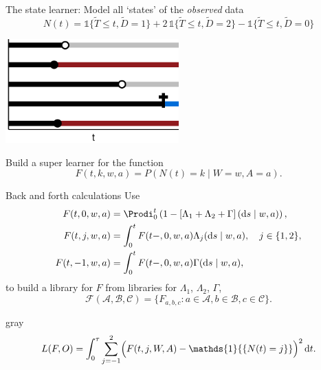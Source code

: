 \documentclass[smaller]{beamer}\usepackage{listings}
\newcommand*\diff{\mathop{}\!\mathrm{d}}
\newcommand{\midd}{\; \middle|\;}
\newcommand{\1}{\mathds{1}}
\begin{document}
\begin{frame}[label={sec:org2d13ae0}]{The state learner: Model all `states' of the \emph{observed} data}
\begin{equation*}
  N(t) = \1{
    \{
      \tilde{T} \leq t, \tilde D=1
    \}} + 2\,\1{\{\tilde{T} \leq t, \tilde
    D=2\}} - \1{\{\tilde{T} \leq t, \tilde D=0\}}
\end{equation*}

\vfil

\begin{center}
\includegraphics[width=0.5\textwidth]{./multi-state-data-3-up.pdf}
\end{center}

\vfil

Build a super learner for the function
\begin{equation*}
    F(t, k, w,a) = P(N(t) = k \mid W=w, A=a).
\end{equation*}
\end{frame}

\begin{frame}[label={sec:org68e1cbf}]{Back and forth calculations}
Use
\begin{align*}
  F(t, 0, w,a)
  &
    = \Prodi_0^t
    \left( 1 - 
    \left[\Lambda_{1} + \Lambda_{2} + \Gamma
    \right](\diff s \mid w,a) \right),
  \\
  F(t, j, w,a)
  &
    = \int_0^t F(t-,0, w,a)  \Lambda_{j}(\diff s \mid w,a),
    \quad  j \in \{1,2\},
  \\
  F(t, -1, w,a)
  &
    = \int_0^tF(t-,0, w,a)  \Gamma(\diff s \mid w,a),
\end{align*}
to build a library for \(F\) from libraries for \(\Lambda_1\), \(\Lambda_2\), \(\Gamma\),
\begin{equation*}
  \mathcal{F}(\mathcal{A}, \mathcal{B}, \mathcal{C})
  = \{ F_{a, b, c} : a \in \mathcal{A}, b \in \mathcal{B},
  c \in \mathcal{C}\}.
\end{equation*}

\pause

\begin{beamercolorbox}[rounded=true]{gray}
\begin{equation*}
  L(F,O) =  \int_0^{\tau} \sum_{j=-1}^{2}
  \Bigl(
    F(t,j,W,A) - \1{\{N(t)=j\}}
    \Bigr)^2
    \diff t.
\end{equation*}
\end{beamercolorbox}
\end{frame}
\end{document}
